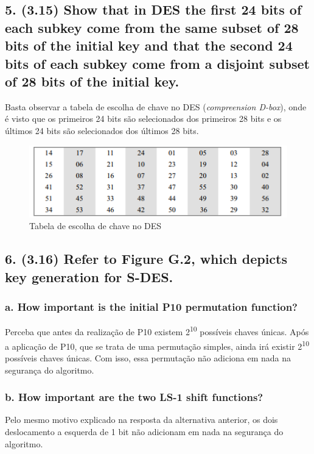 \documentclass[12pt]{article}
\begin{document}
\subsection*{5. (3.15) Show that in DES the first 24 bits of each subkey come
from the same subset of 28 bits of the initial key and that the second 24 bits
of each subkey come from a disjoint subset of 28 bits of the initial key.}

  Basta observar a tabela de escolha de chave no DES (\textit{compreension
  D-box}), onde é visto que os primeiros 24 bits são selecionados dos primeiros
  28 bits e os últimos 24 bits são selecionados dos últimos 28 bits.

  \begin{figure}[h]
    \includegraphics[width=\linewidth]{des_key_table}
    \caption{Tabela de escolha de chave no DES}
  \end{figure}

\subsection*{6. (3.16) Refer to Figure G.2, which depicts key generation for
S-DES.}

  \subsubsection*{a. How important is the initial P10 permutation function?}

    Perceba que antes da realização de P10 existem 2\textsuperscript{10}
    possíveis chaves únicas. Após a aplicação de P10, que se trata de uma
    permutação simples, ainda irá existir 2\textsuperscript{10} possíveis chaves
    únicas. Com isso, essa permutação não adiciona em nada na segurança do
    algoritmo.

  \subsubsection*{b. How important are the two LS-1 shift functions?}

    Pelo mesmo motivo explicado na resposta da alternativa anterior, os dois
    deslocamento a esquerda de 1 bit não adicionam em nada na segurança do
    algoritmo.
\end{document}

